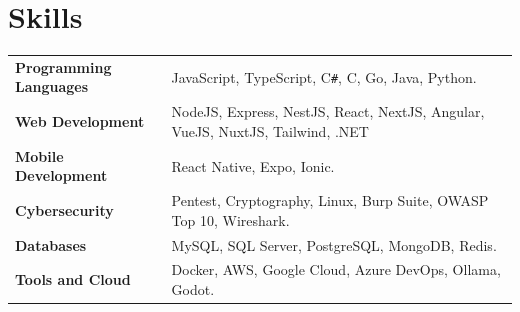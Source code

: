 \documentclass[a4paper,12pt]{article}
\begin{document}

\section{Skills}
\begin{tabularx}{\linewidth}{@{}l X@{}}
\textbf{Programming Languages} & \normalsize{JavaScript, TypeScript, C{\texttt{\#}}, C, Go, Java, Python.}\\
\textbf{Web Development} & \normalsize{NodeJS, Express, NestJS, React, NextJS, Angular, VueJS, NuxtJS, Tailwind, .NET}\\
\textbf{Mobile Development} & \normalsize{React Native, Expo, Ionic.}\\
\textbf{Cybersecurity} & \normalsize{Pentest, Cryptography, Linux, Burp Suite, OWASP Top 10, Wireshark.}\\
\textbf{Databases}  &  \normalsize{MySQL, SQL Server, PostgreSQL, MongoDB, Redis.}\\
\textbf{Tools and Cloud}  &  \normalsize{Docker, AWS, Google Cloud, Azure DevOps, Ollama, Godot.}\\  
\end{tabularx}

\vfill
{}
\end{document}
